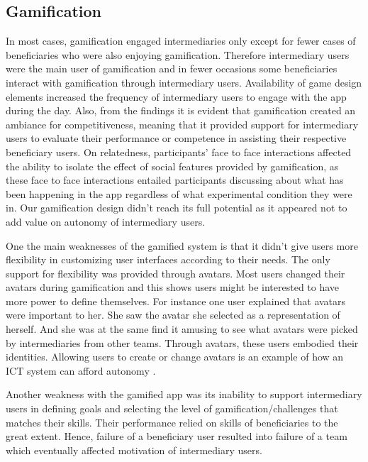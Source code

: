 \documentclass{sig-alternate}
\begin{document}
\subsection*{\textbf{Gamification}} 
In most cases, gamification engaged intermediaries only except for fewer cases of beneficiaries who were also enjoying gamification. Therefore intermediary users were the main user of gamification and in fewer occasions some beneficiaries interact with gamification through intermediary users. Availability of game design elements increased the frequency of intermediary users to engage with the app during the day. Also, from the findings it is evident that gamification created an ambiance for competitiveness, meaning that it provided support for intermediary users to evaluate their performance or competence in assisting their respective beneficiary users. On relatedness, participants' face to face interactions affected the ability to isolate the effect of social features provided by gamification, as these face to face interactions entailed participants discussing about what has been happening in the app regardless of what experimental condition they were in. Our gamification design didn't reach its full potential as it appeared not to add value on autonomy of intermediary users. 

One the main weaknesses of the gamified system is that it didn't give users more flexibility in customizing user interfaces according to their needs. The only support for flexibility was provided through avatars. Most users changed their avatars during gamification  and this shows users might be interested to have more power to define themselves. For instance one user explained that avatars were important to her. She saw the avatar she selected as a representation of herself. And she was at the same find it amusing to see what avatars were picked by intermediaries from other teams. Through avatars, these users embodied their identities. Allowing users to create or change avatars is an example of how an ICT system can afford autonomy \cite{zhang2008:motivational}.

Another weakness with the gamified app was its inability to support intermediary users in defining goals and selecting the level of gamification/challenges that matches their skills. Their performance relied on skills of beneficiaries to the great extent. Hence, failure of a beneficiary user resulted into failure of a team which eventually affected motivation of intermediary users.
\end{document}
